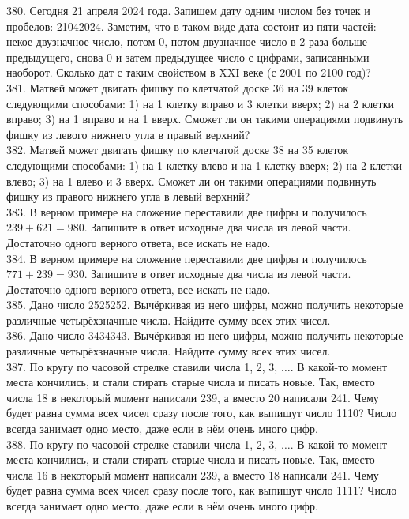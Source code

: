 380.  Сегодня 21 апреля 2024 года. Запишем дату одним числом без точек и пробелов: 21042024.
Заметим, что в таком виде дата состоит из пяти частей: некое двузначное число, потом 0, потом
двузначное число в 2 раза больше предыдущего, снова 0 и затем предыдущее число с цифрами,
записанными наоборот. Сколько дат с таким свойством в XXI веке (с 2001 по 2100 год)?\\
381. Матвей может двигать фишку по клетчатой доске 36 на 39 клеток следующими способами:
1) на 1 клетку вправо и 3 клетки вверх; 2) на 2 клетки вправо; 3) на 1 вправо и на 1 вверх.
Сможет ли он такими операциями подвинуть фишку из левого нижнего угла в правый верхний?\\
382.  Матвей может двигать фишку по клетчатой доске 38 на 35 клеток следующими способами:
1) на 1 клетку влево и на 1 клетку вверх; 2) на 2 клетки влево; 3) на 1 влево и 3 вверх.
Сможет ли он такими операциями подвинуть фишку из правого нижнего угла в левый верхний?\\
383. В верном примере на сложение переставили две цифры и получилось $239+621=980.$ Запишите в ответ исходные два числа из левой части. Достаточно одного верного ответа, все искать не надо.\\
384. В верном примере на сложение переставили две цифры и получилось $771+239=930.$ Запишите в ответ исходные два числа из левой части. Достаточно одного верного ответа, все искать не надо.\\
385. Дано число 2525252. Вычёркивая из него цифры, можно получить некоторые различные четырёхзначные числа. Найдите сумму всех этих чисел.\\
386. Дано число 3434343. Вычёркивая из него цифры, можно получить некоторые различные четырёхзначные числа. Найдите сумму всех этих чисел.\\
387. По кругу по часовой стрелке ставили числа 1, 2, 3, $\ldots.$ В какой-то момент места кончились, и стали стирать старые числа и писать новые. Так, вместо числа 18 в некоторый момент написали 239, а вместо 20 написали 241. Чему будет равна сумма всех чисел сразу после того, как выпишут число 1110? Число всегда занимает одно место, даже если в нём очень много цифр.\\
388. По кругу по часовой стрелке ставили числа 1, 2, 3, $\ldots.$ В какой-то момент места кончились, и стали стирать старые числа и писать новые. Так, вместо числа 16 в некоторый момент написали 239, а вместо 18 написали 241. Чему будет равна сумма всех чисел сразу после того, как выпишут число 1111? Число всегда занимает одно место, даже если в нём очень много цифр.\\
